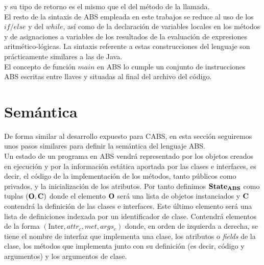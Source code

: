 

y su tipo de retorno es el mismo que el del método de la llamada.\\

El resto de la sintaxis de ABS empleada en este trabajos se reduce al uso de los $if/else$ y del $while$, así como de la declaración de variables locales en los métodos y de asignaciones a variables de los resultados de la evaluación de expresiones aritmético-lógicas. La sintaxis referente a estas construcciones del lenguaje son prácticamente similares a las de Java.\\

El concepto de función $main$ en ABS lo cumple un conjunto de instrucciones ABS escritas entre llaves y situadas al final del archivo del código.

\section{Semántica}

De forma similar al desarrollo expuesto para CABS, en esta sección seguiremos unos pasos similares para definir la semántica del lenguaje ABS.\\

Un estado de un programa en ABS vendrá representado por los objetos creados en ejecución y por la información estática aportada por las clases e interfaces, es decir, el código de la implementación de los métodos, tanto públicos como privados, y la inicialización de los atributos. Por tanto definimos $\textbf{State}_{\textbf{ABS}}$ como tuplas $(\mathbf{O}, \mathbf{C})$ donde el elemento $\mathbf{O}$ será una lista de objetos instanciados y $\mathbf{C}$ contendrá la definición de las clases e interfaces. Este último elemento será una lista de definiciones indexada por un identificador de clase. Contendrá elementos de la forma $(\mbox{Inter}, attr_c, met, args_c)$ donde, en orden de izquierda a derecha, se tiene el nombre de interfaz que implementa una clase, los atributos o \emph{fields} de la clase, los métodos que implementa junto con su definición (es decir, código y argumentos) y los argumentos de clase.\\

